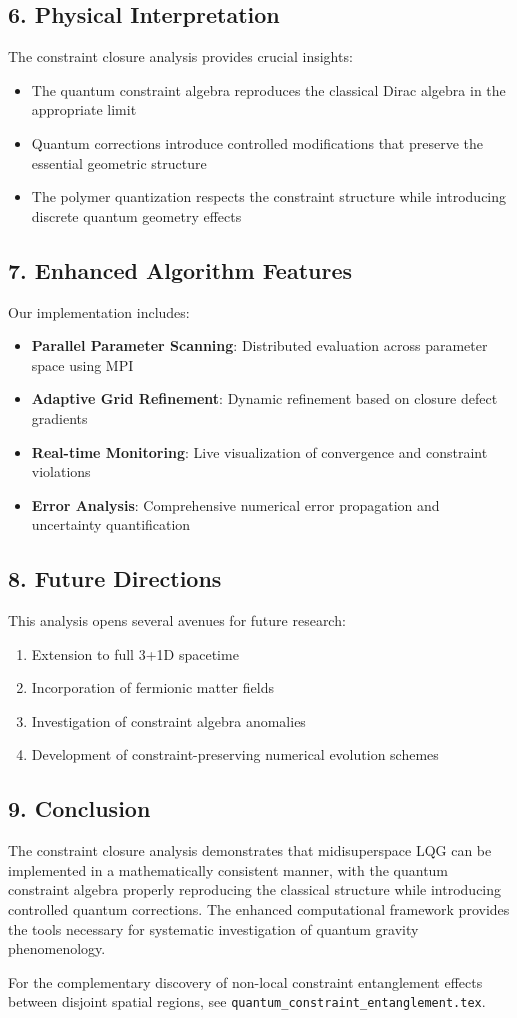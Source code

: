 \documentclass[12pt]{article}
\begin{document}
\subsection*{6. Physical Interpretation}
The constraint closure analysis provides crucial insights:
\begin{itemize}
  \item The quantum constraint algebra reproduces the classical Dirac algebra in the appropriate limit
  \item Quantum corrections introduce controlled modifications that preserve the essential geometric structure
  \item The polymer quantization respects the constraint structure while introducing discrete quantum geometry effects
\end{itemize}

\subsection*{7. Enhanced Algorithm Features}
Our implementation includes:
\begin{itemize}
  \item \textbf{Parallel Parameter Scanning}: Distributed evaluation across parameter space using MPI
  \item \textbf{Adaptive Grid Refinement}: Dynamic refinement based on closure defect gradients
  \item \textbf{Real-time Monitoring}: Live visualization of convergence and constraint violations
  \item \textbf{Error Analysis}: Comprehensive numerical error propagation and uncertainty quantification
\end{itemize}

\subsection*{8. Future Directions}
This analysis opens several avenues for future research:
\begin{enumerate}
  \item Extension to full 3+1D spacetime
  \item Incorporation of fermionic matter fields
  \item Investigation of constraint algebra anomalies
  \item Development of constraint-preserving numerical evolution schemes
\end{enumerate}

\subsection*{9. Conclusion}
The constraint closure analysis demonstrates that midisuperspace LQG can be implemented in a mathematically consistent manner, with the quantum constraint algebra properly reproducing the classical structure while introducing controlled quantum corrections. The enhanced computational framework provides the tools necessary for systematic investigation of quantum gravity phenomenology.

For the complementary discovery of non-local constraint entanglement effects between disjoint spatial regions, see \texttt{quantum\_constraint\_entanglement.tex}.
\end{document}
